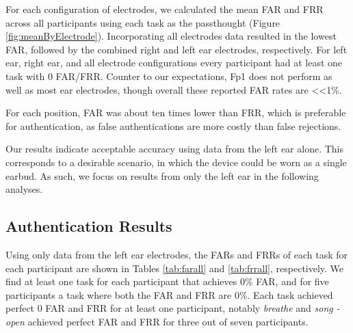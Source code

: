 \documentclass{sigchi}
\begin{document}
For each configuration of electrodes, we calculated the mean FAR and FRR across all participants using each task as the passthought (Figure \ref{fig:meanByElectrode}). Incorporating all electrodes data resulted in the lowest FAR, followed by the combined right and left ear electrodes, respectively. For left ear, right ear, and all electrode configurations every participant had at least one task with 0 FAR/FRR. Counter to our expectations, Fp1 does not perform as well as most ear electrodes, though overall these reported FAR rates are \textless\textless 1\%. 

For each position, FAR was about ten times lower than FRR, which is preferable for authentication, as false authentications are more costly than false rejections.

Our results indicate acceptable accuracy using data from the left ear alone. This corresponds to a desirable scenario, in which the device could be worn as a single earbud. As such, we focus on results from only the left ear in the following analyses.

\subsection{Authentication Results}

Using only data from the left ear electrodes, the FARs and FRRs of each task for each participant are shown in Tables \ref{tab:farall} and \ref{tab:frrall}, respectively. We find at least one task for each participant that achieves 0\% FAR, and for five participants a task where both the FAR and FRR are 0\%. Each task achieved perfect 0 FAR and FRR for at least one participant, notably \textit{breathe} and \textit{song - open} achieved perfect FAR and FRR for three out of seven participants.
\end{document}
